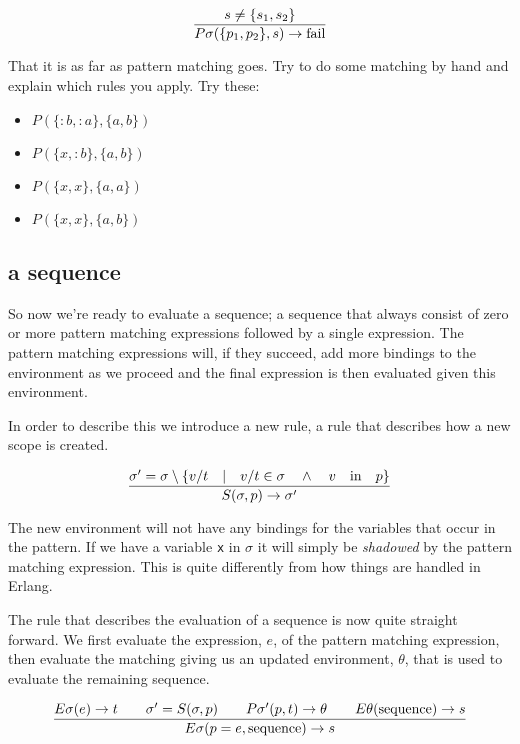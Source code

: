 \documentclass[a4paper,11pt]{article}
\begin{document}
$$\frac{s \not = \{s_1, s_2\}}{P\sigma(\lbrace p_1, p_2 \rbrace, s) \rightarrow {\rm fail}}$$

That it is as far as pattern matching goes. Try to do some matching by
hand and explain which rules you apply. Try these:

\begin{itemize}
  
\item $P{}(\lbrace :b, :a \rbrace, \lbrace a, b \rbrace)$  
\item $P{}(\lbrace x, :b \rbrace, \lbrace a, b \rbrace)$
\item $P{}(\lbrace x, x \rbrace, \lbrace a, a \rbrace)$
\item $P{}(\lbrace x, x \rbrace, \lbrace a, b \rbrace)$
\end{itemize}


\subsection{a sequence}

So now we're ready to evaluate a sequence; a sequence that always
consist of zero or more pattern matching expressions followed by a
single expression. The pattern matching expressions will, if they
succeed, add more bindings to the environment as we proceed and the
final expression is then evaluated given this environment.

In order to describe this we introduce a new rule, a rule that
describes how a new scope is created.

$$\frac{\sigma' = \sigma \setminus \lbrace v/t \quad | \quad v/t \in \sigma \quad \wedge \quad  v \quad {\rm in} \quad p\rbrace}{S(\sigma, p) \rightarrow \sigma'}$$

The new environment will not have any bindings for the variables that
occur in the pattern. If we have a variable {\tt x} in $\sigma$ it
will simply be {\em shadowed} by the pattern matching expression.
This is quite differently from how things are handled in 
Erlang.

The rule that describes the evaluation of a sequence is now quite
straight forward. We first evaluate the expression, $e$, of the
pattern matching expression, then evaluate the matching giving us an
updated environment, $\theta$, that is used to evaluate the remaining
sequence. 

$$\frac{   
  E\sigma(e) \rightarrow t
  \qquad \sigma' = S(\sigma, p)
  \qquad P\sigma'(p, t) \rightarrow \theta
  \qquad E\theta({\rm sequence}) \rightarrow s
}{E\sigma(p = e, {\rm sequence}) \rightarrow s}$$ 
\end{document}
